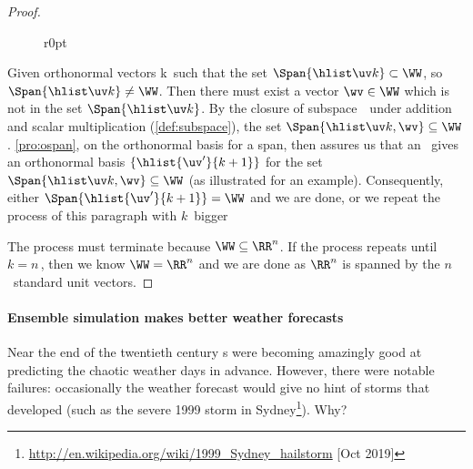 \begin{proof}
\begin{figure}r{0pt}
\end{figure}
Given orthonormal vectors \hlist\uv k\ such that the set \(\Span\{\hlist\uv k\}\subset\WW\), so \(\Span\{\hlist\uv k\}\neq\WW\).  
Then there must exist a vector \(\wv\in\WW\) which is not in the set \(\Span\{\hlist\uv k\}\).
By the closure of subspace~\WW\ under addition and scalar multiplication (\cref{def:subspace}), the set \(\Span\{\hlist\uv k,\wv\}\subseteq\WW\).
\cref{pro:ospan}, on the orthonormal basis for a span, then assures us that an \svd\ gives an orthonormal basis \(\{\hlist{\uv'}{k+1}\}\) for the set \(\Span\{\hlist\uv k,\wv\}\subseteq\WW\) (as illustrated for an example).
Consequently, either \(\Span\{\hlist{\uv'}{k+1}\}=\WW\) and we are done, or we repeat the process of this paragraph with \(k\)~bigger 

The process must terminate because \(\WW\subseteq\RR^n\). 
If the process repeats until \(k=n\)\,, then we know \(\WW=\RR^n\) and we are done as \(\RR^n\) is spanned by the \(n\)~standard unit vectors.
\end{proof}





\paragraph{Ensemble simulation makes better weather forecasts}
Near the end of the twentieth century s were becoming amazingly good at predicting the chaotic weather days in advance.
However, there were notable failures: occasionally the weather forecast would give no hint of storms that developed (such as the severe 1999 storm in Sydney\footnote{\url{http://en.wikipedia.org/wiki/1999_Sydney_hailstorm} [Oct 2019]}).
Why?

